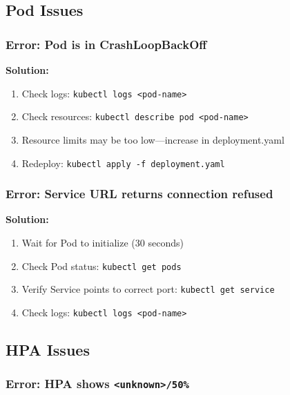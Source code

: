 \documentclass[12pt,a4paper]{article}
\begin{document}
\subsection{Pod Issues}

\subsubsection{Error: Pod is in CrashLoopBackOff}

\begin{warningbox}
\textbf{Solution:}
\begin{enumerate}
    \item Check logs: \texttt{kubectl logs <pod-name>}
    \item Check resources: \texttt{kubectl describe pod <pod-name>}
    \item Resource limits may be too low—increase in deployment.yaml
    \item Redeploy: \texttt{kubectl apply -f deployment.yaml}
\end{enumerate}
\end{warningbox}

\subsubsection{Error: Service URL returns connection refused}

\begin{warningbox}
\textbf{Solution:}
\begin{enumerate}
    \item Wait for Pod to initialize (30 seconds)
    \item Check Pod status: \texttt{kubectl get pods}
    \item Verify Service points to correct port: \texttt{kubectl get service}
    \item Check logs: \texttt{kubectl logs <pod-name>}
\end{enumerate}
\end{warningbox}

\subsection{HPA Issues}

\subsubsection{Error: HPA shows \texttt{<unknown>/50\%}}
\end{document}
